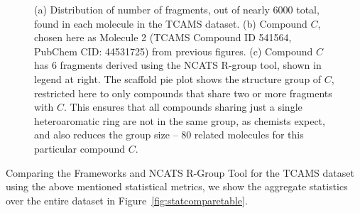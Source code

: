 \documentclass[journal=jacsat,manuscript=article]{achemso}
\newcommand*\fref[1]{Figure~\ref{fig:#1}}
\begin{document}
\begin{figure}
  \caption{
    (a) Distribution of number of fragments, out of nearly 6000 total, found in each molecule in the TCAMS dataset. (b) Compound $C$, chosen here as Molecule 2 (TCAMS Compound ID 541564, PubChem CID: 44531725) from previous figures.
    (c) Compound $C$ has 6 fragments derived using the NCATS R-group tool, shown in legend at right. The scaffold pie plot shows the structure group of $C$, restricted here to only compounds that share two or more fragments with $C$. This ensures that all compounds sharing just a single heteroaromatic ring are not in the same group, as chemists expect, and also reduces the group size -- 80 related molecules for this particular compound $C$.}
    \label{fig:strucgroup}
\end{figure}


Comparing the Frameworks and NCATS R-Group Tool for the TCAMS dataset using the above mentioned statistical metrics, we show the aggregate statistics over the entire dataset in \fref{statcomparetable}.  
\end{document}

